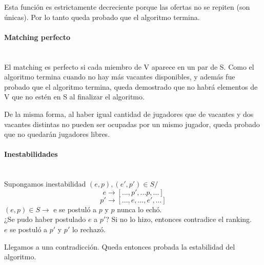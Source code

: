\documentclass{article}
\begin{document}
\begin{enumerate}
        Esta función es estrictamente decreciente porque las ofertas no se repiten (son únicas). Por lo tanto queda probado que el algoritmo termina.

        \paragraph{Matching perfecto}\mbox{}\\
        El matching es perfecto si cada miembro de V aparece en un par de S. Como el algoritmo termina cuando no hay más vacantes disponibles, y además fue probado que el algoritmo termina, queda demostrado que no habrá elementos de V que no estén en S al finalizar el algoritmo. 

        De la misma forma, al haber igual cantidad de jugadores que de vacantes y dos vacantes distintas no pueden ser ocupadas por un mismo jugador, queda probado que no quedarán jugadores libres.

        \paragraph{Inestabilidades}\mbox{}\\
        Supongamos inestabilidad $(e,p), (e',p') \in S /$ $$e\rightarrow [...,p',...p,...]$$ $$p'\rightarrow [...,e,...,e',...]$$
        $(e,p) \in S \rightarrow $ e se postuló a $p$ y $p$ nunca lo echó.\\

        ¿Se pudo haber postulado $e$ a $p'$? Si no lo hizo, entonces contradice el ranking.\\

        $e$ se postuló a $p'$ y $p'$ lo rechazó.

        Llegamos a una contradicción. Queda entonces probada la estabilidad del algoritmo.
\end{enumerate}
\end{document}
